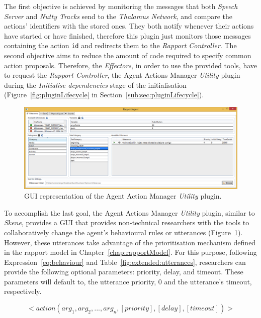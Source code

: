 The first objective is achieved by monitoring the messages that both \textit{Speech Server} and \textit{Nutty Tracks} send to the \textit{Thalamus Network}, and compare the actions' identifiers with the stored ones. They both notify whenever their actions have started or have finished, therefore this plugin just monitors those messages containing the action \texttt{id} and redirects them to the \textit{Rapport Controller}. The second objective aims to reduce the amount of code required to specify common action proposals. Therefore, the \textit{Effectors}, in order to use the provided tools, have to request the \textit{Rapport Controller}, the Agent Actions Manager \textit{Utility} plugin during the \textit{Initialise dependencies} stage of the initialisation (Figure~\ref{fig:pluginLifecycle} in Section~\ref{sub:sec:pluginLifecycle}).

\begin{figure}[H]
	\centering
	\includegraphics[width=\textwidth]{images/ScreenshotAgentsManager.png}
	\caption{\ac{GUI} representation of the Agent Action Manager \textit{Utility} plugin.}
	\label{fig:agentActionsManagerScreenshot}
\end{figure}

To accomplish the last goal, the Agent Actions Manager \textit{Utility} plugin, similar to \textit{Skene}, provides a \ac{GUI} that provides non-technical researchers with the tools to collaboratively change the agent's behavioural rules or utterances (Figure~\ref{fig:agentActionsManagerScreenshot}). However, these utterances take advantage of the prioritisation mechanism defined in the rapport model in Chapter~\ref{chap:rapportModel}. For this purpose, following Expression~\ref{eq:behaviour} and Table~\ref{fig:extended:utterances}, researchers can provide the following optional parameters: priority, delay, and timeout. These parameters will default to, the utterance priority, 0 and the utterance's timeout, respectively. 

\begin{equation}
	<action(arg_1, arg_2, ..., arg_n, [priority], [delay], [timeout])>
	\label{eq:behaviour}
\end{equation}

